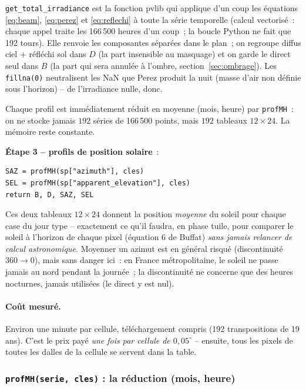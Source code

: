 \documentclass[11pt,a4paper]{article}
\newcommand{\fonction}[1]{\texttt{#1}}
\begin{document}
\fonction{get\_total\_irradiance} est la fonction pvlib qui applique d'un coup
les équations \eqref{eq:beam}, \eqref{eq:perez} et \eqref{eq:reflechi} à toute
la série temporelle (calcul vectorisé~: chaque appel traite les
166\,500 heures d'un coup~; la boucle Python ne fait que 192 tours). Elle
renvoie les composantes séparées dans le plan~; on regroupe diffus ciel
$+$ réfléchi sol dans $D$ (la part insensible au masquage) et on garde le direct
seul dans $B$ (la part qui sera annulée à l'ombre,
section~\ref{sec:ombrage}). Les \fonction{fillna(0)} neutralisent les NaN que
Perez produit la nuit (masse d'air non définie sous l'horizon) -- de
l'irradiance nulle, donc.

Chaque profil est immédiatement réduit en moyenne (mois, heure) par
\fonction{profMH}~: on ne stocke jamais $192$ séries de 166\,500 points, mais
$192$ tableaux $12\times24$. La mémoire reste constante.

\textbf{Étape 3 -- profils de position solaire}~:

\begin{lstlisting}
SAZ = profMH(sp["azimuth"], cles)
SEL = profMH(sp["apparent_elevation"], cles)
return B, D, SAZ, SEL
\end{lstlisting}

Ces deux tableaux $12\times24$ donnent la position \emph{moyenne} du soleil pour
chaque case du jour type -- exactement ce qu'il faudra, en phase tuile, pour
comparer le soleil à l'horizon de chaque pixel (équation 6 de Buffat) \emph{sans
jamais relancer de calcul astronomique}. Moyenner un azimut est en général
risqué (discontinuité $360 \to 0$), mais sans danger ici~: en France
métropolitaine, le soleil ne passe jamais au nord pendant la journée~; la
discontinuité ne concerne que des heures nocturnes, jamais utilisées (le direct
y est nul).

\paragraph{Coût mesuré.} Environ une minute par cellule, téléchargement compris
(192 transpositions de 19 ans). C'est le prix payé \emph{une fois par cellule de
$0{,}05^\circ$} -- ensuite, tous les pixels de toutes les dalles de la cellule
se servent dans la table.

\subsubsection{\fonction{profMH(serie, cles)} : la réduction (mois, heure)}
\end{document}
